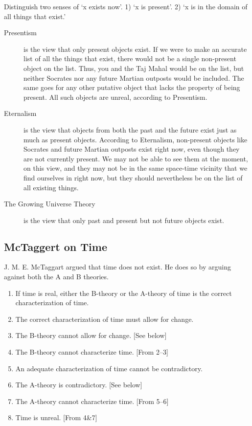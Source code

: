 \documentclass[oneside, 11]{article}
\begin{document}
Distinguish two senses of `x exists now'. 1) `x is present'. 2) `x is in the domain of all things that exist.' 

\begin{description}
\item[Presentism] is the view that only present objects exist. If we were to make an accurate list of all the things that exist, there would not be a single non-present object on the list. Thus, you and the Taj Mahal would be on the list, but neither Socrates nor any future Martian outposts would be included. The same goes for any other putative object that lacks the property of being present. All such objects are unreal, according to Presentism.
\item[Eternalism] is the view that objects from both the past and the future exist just as much as present objects. According to Eternalism, non-present objects like Socrates and future Martian outposts exist right now, even though they are not currently present. We may not be able to see them at the moment, on this view, and they may not be in the same space-time vicinity that we find ourselves in right now, but they should nevertheless be on the list of all existing things.
\item[The Growing Universe Theory] is the view that only past and present but not future objects exist. 
\end{description}


\subsection*{McTaggert on Time}
J. M. E. McTaggart argued that time does not exist. He does so by arguing against both the A and B theories. 

\begin{enumerate}
\item If time is real, either the B-theory or the A-theory of time is the correct characterization of time. 
\item The correct characterization of time must allow for change. 
\item The B-theory cannot allow for change. [See below]
\item The B-theory cannot characterize time. [From 2--3]
\item An adequate characterization of time cannot be contradictory. 
\item The A-theory is contradictory. [See below]
\item The A-theory cannot characterize time. [From 5--6] 
\item Time is unreal. [From 4\&7]
\end{enumerate}
\end{document}
